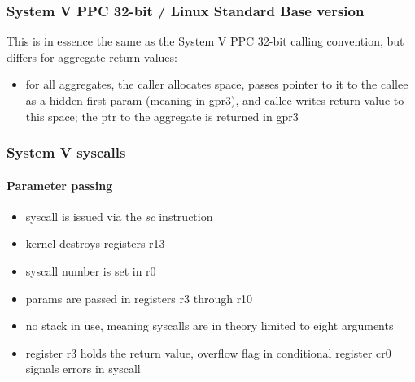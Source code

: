 \subsubsection{System V PPC 32-bit / Linux Standard Base version}

This is in essence the same as the System V PPC 32-bit calling convention, but differs for aggregate return values:

\begin{itemize}
\item for all aggregates, the caller allocates space, passes pointer to it to the callee as a hidden first param
(meaning in gpr3), and callee writes return value to this space; the ptr to the aggregate is returned in gpr3
\end{itemize}


\clearpage

\subsubsection{System V syscalls}

\paragraph{Parameter passing}

\begin{itemize}
\item syscall is issued via the {\em sc} instruction
\item kernel destroys registers r13
\item syscall number is set in r0
\item params are passed in registers r3 through r10
\item no stack in use, meaning syscalls are in theory limited to eight arguments
\item register r3 holds the return value, overflow flag in conditional register cr0 signals errors in syscall
\end{itemize}

